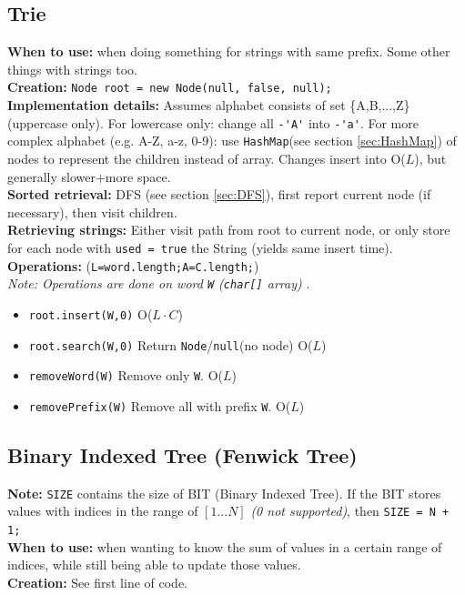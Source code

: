 \documentclass[a4paper,10pt]{article}
\begin{document}
\begin{multicols}{2}
\subsection{Trie}
\textbf{When to use:} when doing something for strings with same prefix. Some other things with strings too.\\
\textbf{Creation:} \lstinline|Node root = new Node(null, false, null);|\\
\textbf{Implementation details:} Assumes alphabet consists of set \{A,B,...,Z\}(uppercase only). For lowercase only: change all \lstinline|-'A'| into \lstinline|-'a'|. For more complex alphabet (e.g. A-Z, a-z, 0-9): use \lstinline|HashMap|(see section \ref{sec:HashMap}) of nodes to represent the children instead of array. Changes insert into O($L$), but generally slower+more space.\\
\textbf{Sorted retrieval:} DFS (see section \ref{sec:DFS}), first report current node (if necessary), then visit children.\\
\textbf{Retrieving strings:} Either visit path from root to current node, or only store for each node with \lstinline|used = true| the String (yields same insert time).\\
\textbf{Operations:} (\lstinline|L=word.length;A=C.length;|)\\
\textit{Note: Operations are done on word \lstinline|W| (\lstinline|char[]| array)} .
\begin{itemize}[nolistsep,noitemsep]
\itemsep0em
\item \lstinline|root.insert(W,0)| O($L\cdot C$)
\item \lstinline|root.search(W,0)| Return \lstinline|Node|/\lstinline|null|(no node)  O($L$)
\item \lstinline|removeWord(W)| Remove only \lstinline|W|. O($L$)
\item \lstinline|removePrefix(W)| Remove all with prefix \lstinline|W|. O($L$)

\end{itemize}


\subsection{Binary Indexed Tree (Fenwick Tree)}
\textbf{Note:} \lstinline|SIZE| contains the size of BIT (Binary Indexed  Tree). If the BIT stores values with indices in the range of $[1...N]$ \textit{(0 not supported)}, then \lstinline|SIZE = N + 1;|\\
\textbf{When to use:} when wanting to know the sum of values in a certain range of indices, while still being able to update those values.\\
\textbf{Creation:} See first line of code.

\end{multicols}
\end{document}
